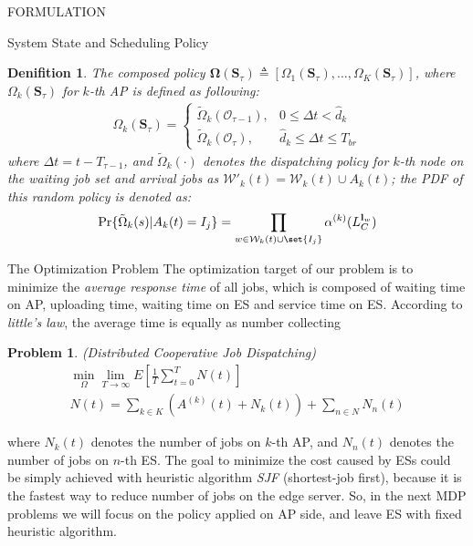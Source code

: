 \documentclass[10pt, conference, letterpaper]{IEEEtran}
\newtheorem{definition}{Denifition}
\newtheorem{problem}{Problem}
\renewcommand{\vec}{\mathbf}
\DeclarePairedDelimiter\set\{\}
\newcommand{\wSet}{\mathcal{W}}
\newcommand{\Stat}{\mathbf{S}}
\newcommand{\Obsv}{\mathcal{O}}
\begin{document}
\begin{section}{FORMULATION}
\begin{subsection}{System State and Scheduling Policy}
\begin{definition}
                The composed policy $\vec{\Omega}(\Stat_\tau) \triangleq [\Omega_1(\Stat_\tau), \dots, \Omega_K(\Stat_\tau)]$, where $\Omega_k(\Stat_\tau)$ for $k$-th AP is defined as following:
                \begin{align}
                    \Omega_k(\Stat_\tau) = 
                    \begin{cases}
                        \tilde{\Omega}_k(\Obsv_{\tau-1}), & 0 \leq \Delta{t} < \hat{d}_k
                        \\
                        \tilde{\Omega}_k(\Obsv_{\tau}), & \hat{d}_k \leq \Delta{t} \leq T_{br}
                    \end{cases}
                \end{align}
                where $\Delta{t} = t - T_{\tau-1}$, and $\tilde{\Omega}_k(\cdot)$ denotes the dispatching policy for $k$-th node on the waiting job set and arrival jobs as $\wSet'_{k}(t)=\wSet_{k}(t) \cup A_k(t)$; the PDF of this random policy is denoted as:
                \begin{align}
                    \Pr\{\tilde{\Omega}_k(s)|A_k(t)=I_j\} = \prod_{w\in\wSet_{k}(t)\cup\set{I_j}} \alpha^{(k)}(L_C^{\vec{l}_w})
                \end{align}
            \end{definition}
        \end{subsection}

        \begin{subsection}{The Optimization Problem}
            The optimization target of our problem is to minimize the \emph{average response time} of all jobs, which is composed of waiting time on AP, uploading time, waiting time on ES and service time on ES. According to \emph{little's law}, the average time is equally as number collecting 
            
            \begin{problem}
                (Distributed Cooperative Job Dispatching)
                \begin{gather}
                    \min_{\Omega} \lim_{T \to \infty} E[\frac{1}{T} \sum_{t=0}^{T} N(t)]
                    \nonumber\\
                    N(t) = \sum_{k \in K} (A^{(k)}(t) + N_k(t))
                            + \sum_{n \in N} N_n(t)
                \end{gather}
            \end{problem}
            where $N_k(t)$ denotes the number of jobs on $k$-th AP, and $N_n(t)$ denotes the number of jobs on $n$-th ES.
            The goal to minimize the cost caused by ESs could be simply achieved with heuristic algorithm \emph{SJF} (shortest-job first), because it is the fastest way to reduce number of jobs on the edge server. So, in the next MDP problems we will focus on the policy applied on AP side, and leave ES with fixed heuristic algorithm.


\end{subsection}
\end{section}
\end{document}
